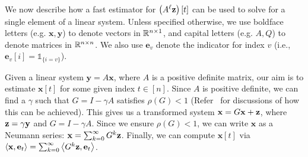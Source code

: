 We now describe how a fast estimator for $\left(A^{\ell}\mathbf{z}\right)[t]$ can be used to solve for a single element of a linear system.
Unless specified otherwise, we use boldface letters (e.g. $\mathbf{x},\mathbf{y}$) to denote vectors in $\mathbb{R}^{n\times 1}$, and capital letters (e.g. $A,Q$) to denote matrices in $\mathbb{R}^{n\times n}$.
We also use $\mathbf{e}_v$ denote the indicator for index $v$ (i.e., $\mathbf{e}_v[i] = \mathds{1}_{\{i=v\}}$). 


Given a linear system $\mathbf{y} = A\mathbf{x}$, where $A$ is a positive definite matrix, our aim is to estimate $\mathbf{x}[t]$ for some given index $t\in[n]$. 
Since $A$ is positive definite, we can find a $\gamma$ such that $G = I - \gamma A$ satisfies $\rho(G) < 1$ (Refer~\cite{dimov2015new,lee2014asynchronous} for discussions of how this can be achieved). 
This gives us a transformed system $\mathbf{x} = G\mathbf{x} + \mathbf{z}$, where $\mathbf{z} = \gamma \mathbf{y}$ and $G = I - \gamma A$. 
Since we ensure $\rho(G)<1$, we can write $\mathbf{x}$ as a Neumann series: $\mathbf{x} = \sum_{k=0}^\infty G^k \mathbf{z}$.
Finally, we can compute $\mathbf{x}[t]$ via $\left< \mathbf{x}, \mathbf{e}_t \right> = \sum_{k=0}^\infty \left< G^k \mathbf{z}, \mathbf{e}_t \right>$. 


